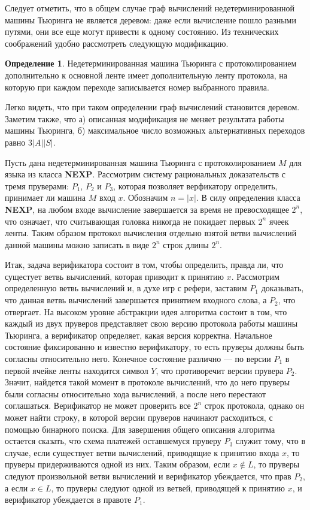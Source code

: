 \documentclass{mipt-thesis-bs}
\theoremstyle{plain}
\theoremstyle{definition}
\newtheorem{definition}{Определение}
\begin{document}
Следует отметить, что в общем случае граф вычислений недетерминированной машины Тьюринга не является деревом: даже если вычисление пошло разными путями, они все еще могут привести к одному состоянию. Из технических соображений удобно рассмотреть следующую модификацию.

\begin{definition}
    Недетерминированная машина Тьюринга с протоколированием дополнительно к основной ленте имеет дополнительную ленту протокола, на которую при каждом переходе записывается номер выбранного правила.
\end{definition}

Легко видеть, что при таком определении граф вычислений становится деревом. Заметим также, что а) описанная модификация не меняет результата работы машины Тьюринга, б) максимальное число возможных альтернативных переходов равно $3|A||S|$.

Пусть дана недетерминированная машина Тьюринга с протоколированием $M$ для языка из класса \textbf{NEXP}. Рассмотрим систему рациональных доказательств с тремя пруверами: $P_1$, $P_2$ и $P_3$, которая позволяет верфикатору определить, принимает ли машина $M$ вход $x$. Обозначим $n = |x|$. В силу определения класса \textbf{NEXP}, на любом входе вычисление завершается за время не превосходящее $2 ^ n$, что означает, что считывающая головка никогда не покидает первых $2^n$ ячеек ленты. Таким образом протокол вычисления отдельно взятой ветви вычислений данной машины можно записать в виде $2^n$ строк длины $2^n$.

Итак, задача верификатора состоит в том, чтобы определить, правда ли, что сущестует ветвь вычислений, которая приводит к принятию $x$. Рассмотрим определенную ветвь вычислений и, в духе игр с рефери, заставим $P_1$ доказывать, что данная ветвь вычислений завершается принятием входного слова, а $P_2$, что отвергает. На высоком уровне абстракции идея алгоритма состоит в том, что каждый из двух пруверов представляет свою версию протокола работы машины Тьюринга, а верификатор определяет, какая версия корректна. Начальное состояние фиксированно и известно верификатору, то есть пруверы должны быть согласны относительно него. Конечное состояние различно --- по версии $P_1$ в первой ячейке ленты находится символ $Y$, что противоречит версии прувера $P_2$. Значит, найдется такой момент в протоколе вычислений, что до него пруверы были согласны относительно хода вычислений, а после него перестают соглашаться.
Верификатор не может проверить все $2^n$ строк протокола, однако он может найти строку, в которой версии пруверов начинают расходиться, с помощью бинарного поиска. Для завершения общего описания алгоритма остается сказать, что схема платежей оставшемуся пруверу $P_3$ служит тому, что в случае, если существует ветви вычислений, приводящие к принятию входа $x$, то пруверы придерживаются одной из них. Таким образом, если $x \notin L$, то пруверы следуют произвольной ветви вычислений и верификатор убеждается, что прав $P_2$, а если $x \in L$, то пруверы следуют одной из ветвей, приводящей к принятию $x$, и верификатор убеждается в правоте $P_1$.
\end{document}
